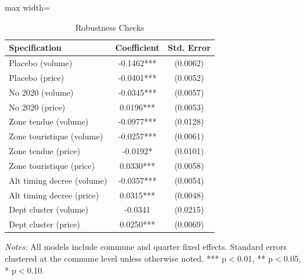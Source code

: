 \begin{table}[htbp]
\centering
\caption{Robustness Checks}
\label{tab:robustness}
\begin{adjustbox}{max width=\textwidth}
\begin{tabular}{lcc}
\hline\hline
Specification & Coefficient & Std. Error \\
\hline
Placebo (volume) & -0.1462*** & (0.0062) \\
Placebo (price) & -0.0401*** & (0.0052) \\
No 2020 (volume) & -0.0345*** & (0.0057) \\
No 2020 (price) & 0.0196*** & (0.0053) \\
Zone tendue (volume) & -0.0977*** & (0.0128) \\
Zone touristique (volume) & -0.0257*** & (0.0061) \\
Zone tendue (price) & -0.0192* & (0.0101) \\
Zone touristique (price) & 0.0330*** & (0.0058) \\
Alt timing decree (volume) & -0.0357*** & (0.0054) \\
Alt timing decree (price) & 0.0315*** & (0.0048) \\
Dept cluster (volume) & -0.0341 & (0.0215) \\
Dept cluster (price) & 0.0250*** & (0.0069) \\
\hline\hline
\end{tabular}
\end{adjustbox}
\begin{minipage}{0.95\textwidth}
\footnotesize
\textit{Notes:} All models include commune and quarter fixed effects. Standard errors clustered at the commune level unless otherwise noted. *** p$<$0.01, ** p$<$0.05, * p$<$0.10.
\end{minipage}
\end{table}

